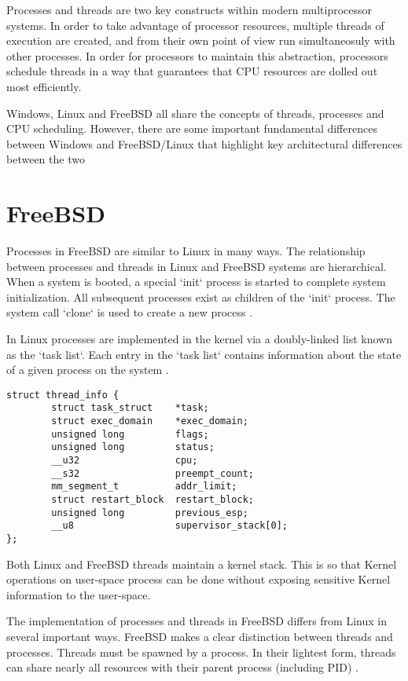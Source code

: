 Processes and threads are two key constructs within modern multiprocessor systems.  In order to take advantage of processor resources, multiple threads of execution are created, and from their own point of view run simultaneosuly with other processes.  In order for processors to maintain this abstraction, processors schedule threads in a way that guarantees that CPU resources are dolled out most efficiently.

Windows, Linux and FreeBSD all share the concepts of threads, processes and CPU scheduling.  However, there are some important fundamental differences between Windows and FreeBSD/Linux that highlight key architectural differences between the two

\section{FreeBSD}

	Processes in FreeBSD are similar to Linux in many ways.  The relationship between processes and threads in Linux and FreeBSD systems are hierarchical.  When a system is booted, a special `init` process is started to complete system initialization.  All subsequent processes exist as children of the `init` process.  The system call `clone` is used to create a new process \cite{lkd}.

	In Linux processes are implemented in the kernel via a doubly-linked list known as the `task list`.  Each entry in the `task list` contains information about the state of a given process on the system \cite{lkd}.

\begin{lstlisting}
struct thread_info {
        struct task_struct    *task;
        struct exec_domain    *exec_domain;
        unsigned long         flags;
        unsigned long         status;
        __u32                 cpu;
        __s32                 preempt_count;
        mm_segment_t          addr_limit;
        struct restart_block  restart_block;
        unsigned long         previous_esp;
        __u8                  supervisor_stack[0];
};
\end{lstlisting}

	Both Linux and FreeBSD threads maintain a kernel stack.  This is so that Kernel operations on user-space process can be done without exposing sensitive Kernel information to the user-space.

	The implementation of processes and threads in FreeBSD differs from Linux in several important ways.  
	FreeBSD makes a clear distinction between threads and processes.  Threads must be spawned by a process.  In their lightest form, threads can share nearly all resources with their parent process (including PID) \cite{freebsd}.

